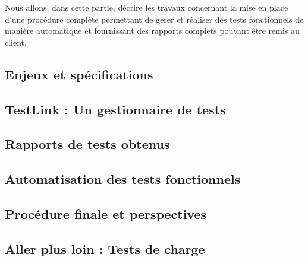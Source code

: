 	Nous allons, dans cette partie, décrire les travaux concernant la mise en place d'une procédure complète permettant de gérer et réaliser des tests fonctionnels de manière automatique et fournissant des rapports complets pouvant être remis au client.

\subsection{Enjeux et spécifications}
	

\subsection{TestLink : Un gestionnaire de tests}
	
	
\subsection{Rapports de tests obtenus}
	

\subsection{Automatisation des tests fonctionnels}
	
		
\subsection{Procédure finale et perspectives}
	
	
\subsection{Aller plus loin : Tests de charge}
	